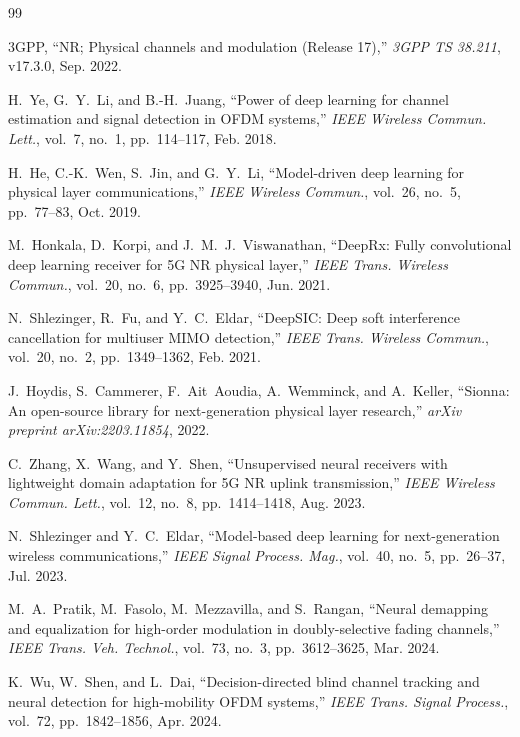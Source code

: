 ﻿\documentclass[journal,twoside]{IEEEtran}
\begin{document}
\newpage
\balance
\begin{thebibliography}{99}

3GPP, ``NR; Physical channels and modulation (Release 17),''
\emph{3GPP TS 38.211}, v17.3.0, Sep. 2022.

H.~Ye, G.~Y.~Li, and B.-H.~Juang, ``Power of deep learning for channel estimation and signal detection in OFDM systems,''
\emph{IEEE Wireless Commun. Lett.}, vol.~7, no.~1, pp.~114--117, Feb. 2018.

H.~He, C.-K.~Wen, S.~Jin, and G.~Y.~Li, ``Model-driven deep learning for physical layer communications,''
\emph{IEEE Wireless Commun.}, vol.~26, no.~5, pp.~77--83, Oct. 2019.

M.~Honkala, D.~Korpi, and J.~M.~J.~Viswanathan, ``DeepRx: Fully convolutional deep learning receiver for 5G NR physical layer,''
\emph{IEEE Trans. Wireless Commun.}, vol.~20, no.~6, pp.~3925--3940, Jun. 2021.

N.~Shlezinger, R.~Fu, and Y.~C.~Eldar, ``DeepSIC: Deep soft interference cancellation for multiuser MIMO detection,''
\emph{IEEE Trans. Wireless Commun.}, vol.~20, no.~2, pp.~1349--1362, Feb. 2021.

J.~Hoydis, S.~Cammerer, F.~Ait~Aoudia, A.~Wemminck, and A.~Keller, ``Sionna: An open-source library for next-generation physical layer research,''
\emph{arXiv preprint arXiv:2203.11854}, 2022.

C.~Zhang, X.~Wang, and Y.~Shen, ``Unsupervised neural receivers with lightweight domain adaptation for 5G NR uplink transmission,''
\emph{IEEE Wireless Commun. Lett.}, vol.~12, no.~8, pp.~1414--1418, Aug. 2023.

N.~Shlezinger and Y.~C.~Eldar, ``Model-based deep learning for next-generation wireless communications,''
\emph{IEEE Signal Process. Mag.}, vol.~40, no.~5, pp.~26--37, Jul. 2023.

M.~A.~Pratik, M.~Fasolo, M.~Mezzavilla, and S.~Rangan, ``Neural demapping and equalization for high-order modulation in doubly-selective fading channels,''
\emph{IEEE Trans. Veh. Technol.}, vol.~73, no.~3, pp.~3612--3625, Mar. 2024.

K.~Wu, W.~Shen, and L.~Dai, ``Decision-directed blind channel tracking and neural detection for high-mobility OFDM systems,''
\emph{IEEE Trans. Signal Process.}, vol.~72, pp.~1842--1856, Apr. 2024.


\end{thebibliography}
\end{document}
